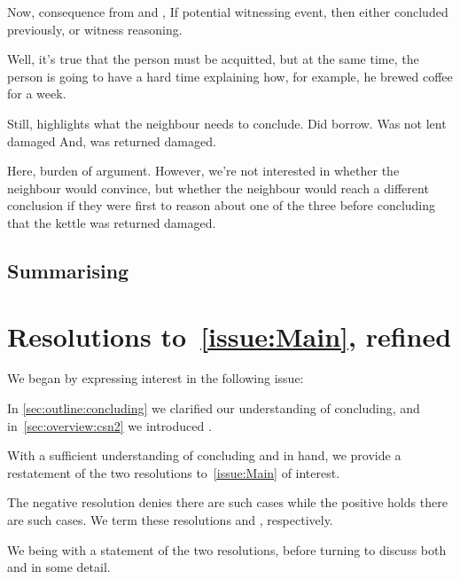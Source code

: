\begin{note}
  Now, consequence from \ideaCS{} and \ESU{},
  If potential witnessing event, then either concluded previously, or witness reasoning.
\end{note}

\begin{note}
  Well, it's true that the person must be acquitted, but at the same time, the person is going to have a hard time explaining how, for example, he brewed coffee for a week.

  Still, highlights what the neighbour needs to conclude.
  Did borrow.
  Was not lent damaged
  And, was returned damaged.

  Here, burden of argument.
  However, we're not interested in whether the neighbour would convince, but whether the neighbour would reach a different conclusion if they were first to reason about one of the three before concluding that the kettle was returned damaged.
\end{note}

\subsection{Summarising}
\label{sec:overview:CS:summarising}



\section{Resolutions to~\autoref{issue:Main}, refined}
\label{sec:issue-refined}

\begin{note}
  We began by expressing interest in the following issue:
  \vspace{-\baselineskip}
  \begin{quote}
    \issueMain*
  \end{quote}
  In \autoref{sec:outline:concluding} we clarified our understanding of concluding, and in~\autoref{sec:overview:csn2} we introduced .

  With a sufficient understanding of concluding and  in hand, we provide a restatement of the two resolutions to~\autoref{issue:Main} of interest.

  The negative resolution denies there are such cases while the positive holds there are such cases.
  We term these resolutions \ESU{} and \EAS{}, respectively.

  We being with a statement of the two resolutions, before turning to discuss both \ESU{} and \EAS{} in some detail.
\end{note}

